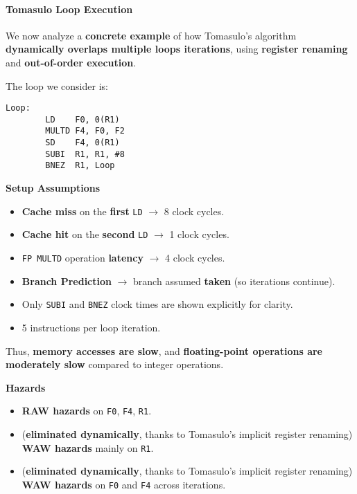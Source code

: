 \paragraph{Tomasulo Loop Execution}\label{paragraph: Tomasulo Loop Execution}

We now analyze a \textbf{concrete example} of how Tomasulo's algorithm \textbf{dynamically overlaps multiple loops iterations}, using \textbf{register renaming} and \textbf{out-of-order execution}.

\highspace
The loop we consider is:
\begin{lstlisting}[language=unknown]
Loop:
        LD    F0, 0(R1)
        MULTD F4, F0, F2
        SD    F4, 0(R1)
        SUBI  R1, R1, #8
        BNEZ  R1, Loop
\end{lstlisting}

\highspace
\begin{flushleft}
    \textcolor{Green3}{ \textbf{Setup Assumptions}}
\end{flushleft}
\begin{itemize}
    \item \textbf{Cache miss} on the \textbf{first} \texttt{LD} $\rightarrow$ 8 clock cycles.
    \item \textbf{Cache hit} on the \textbf{second} \texttt{LD} $\rightarrow$ 1 clock cycles.
    \item \texttt{FP MULTD} operation \textbf{latency} $\rightarrow$ 4 clock cycles.
    \item \textbf{Branch Prediction} $\rightarrow$ branch assumed \textbf{taken} (so iterations continue).
    \item Only \texttt{SUBI} and \texttt{BNEZ} clock times are shown explicitly for clarity.
    \item 5 instructions per loop iteration.
\end{itemize}
Thus, \textbf{memory accesses are slow}, and \textbf{floating-point operations are moderately slow} compared to integer operations.

\highspace
\begin{flushleft}
    \textcolor{Red2}{ \textbf{Hazards}}
\end{flushleft}
\begin{itemize}
    \item[\textcolor{Red2}{\faIcon{times}}] \textbf{RAW hazards} on \texttt{F0}, \texttt{F4}, \texttt{R1}.
    \item[\textcolor{Green3}{\faIcon{check}}] (\textcolor{Green3}{\textbf{eliminated dynamically}}, thanks to Tomasulo's implicit register renaming) \textbf{WAW hazards} mainly on \texttt{R1}.
    \item[\textcolor{Green3}{\faIcon{check}}] (\textcolor{Green3}{\textbf{eliminated dynamically}}, thanks to Tomasulo's implicit register renaming) \textbf{WAW hazards} on \texttt{F0} and \texttt{F4} across iterations.
\end{itemize}

